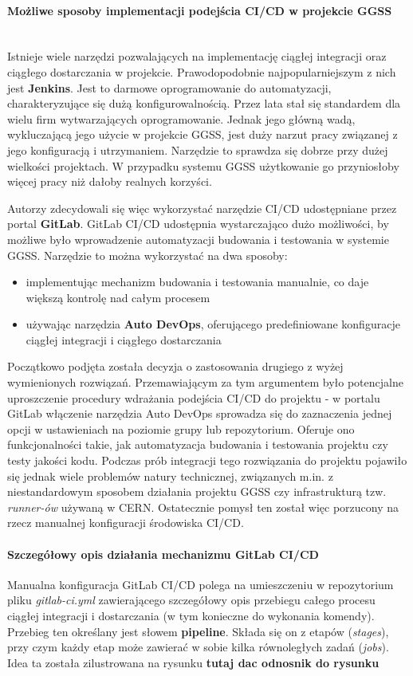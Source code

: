 \paragraph*{Możliwe sposoby implementacji podejścia CI/CD w projekcie GGSS}\mbox{}\\
Istnieje wiele narzędzi pozwalających na implementację ciągłej integracji oraz ciągłego dostarczania w projekcie. Prawodopodobnie najpopularniejszym z nich jest \textbf{Jenkins}. Jest to darmowe oprogramowanie do automatyzacji, charakteryzujące się dużą konfigurowalnością. Przez lata stał się standardem dla wielu firm wytwarzających oprogramowanie. Jednak jego główną wadą, wykluczającą jego użycie w projekcie GGSS, jest duży narzut pracy związanej z jego konfiguracją i utrzymaniem. Narzędzie to sprawdza się dobrze przy dużej wielkości projektach. W przypadku systemu GGSS użytkowanie go przyniosłoby więcej pracy niż dałoby realnych korzyści. 

Autorzy zdecydowali się więc wykorzystać narzędzie CI/CD udostępniane przez portal \textbf{GitLab}. GitLab CI/CD udostępnia wystarczająco dużo możliwości, by możliwe było wprowadzenie automatyzacji budowania i testowania w systemie GGSS. Narzędzie to można wykorzystać na dwa sposoby:
\begin{itemize}
\item implementując mechanizm budowania i testowania manualnie, co daje większą kontrolę nad całym procesem
\item używając narzędzia \textbf{Auto DevOps}, oferującego predefiniowane konfiguracje ciągłej integracji i ciągłego dostarczania
\end{itemize}
Początkowo podjęta została decyzja o zastosowania drugiego z wyżej wymienionych rozwiązań. Przemawiającym za tym argumentem było potencjalne uproszczenie procedury wdrażania podejścia CI/CD do projektu - w portalu GitLab włączenie narzędzia Auto DevOps sprowadza się do zaznaczenia jednej opcji w ustawieniach na poziomie grupy lub repozytorium. Oferuje ono funkcjonalności takie, jak automatyzacja budowania i testowania projektu czy testy jakości kodu. Podczas prób integracji tego rozwiązania do projektu pojawiło się jednak wiele problemów natury technicznej, związanych m.in. z niestandardowym sposobem działania projektu GGSS czy infrastrukturą tzw. \textit{runner-ów} używaną w CERN. Ostatecznie pomysł ten został więc porzucony na rzecz manualnej konfiguracji środowiska CI/CD. 

\paragraph*{Szczegółowy opis działania mechanizmu GitLab CI/CD}
Manualna konfiguracja GitLab CI/CD polega na umieszczeniu w repozytorium pliku \textit{gitlab-ci.yml} zawierającego szczegółowy opis przebiegu całego procesu ciągłej integracji i dostarczania (w tym konieczne do wykonania komendy). Przebieg ten określany jest słowem \textbf{pipeline}. Składa się on z etapów (\textit{stages}), przy czym każdy etap może zawierać w sobie kilka równoległych zadań (\textit{jobs}). Idea ta została zilustrowana na rysunku \textbf{tutaj dac odnosnik do rysunku}

